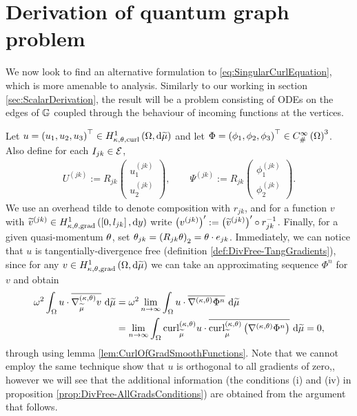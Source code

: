 \section{Derivation of quantum graph problem} \label{sec:3DSystemDerivation}
We now look to find an alternative formulation to \eqref{eq:SingularCurlEquation}, which is more amenable to analysis.
Similarly to our working in section \ref{sec:ScalarDerivation}, the result will be a problem consisting of ODEs on the edges of $\mathbb{G}$ coupled through the behaviour of incoming functions at the vertices.

Let $u=\left( u_1,u_2,u_3 \right)^\top\in H^1_{\kappa,\theta,\mathrm{curl}}\left( \Omega, \mathrm{d}\widetilde{\mu} \right)$ and let $\Phi=\left( \phi_1,\phi_2,\phi_3 \right)^\top\in C^{\infty}_{\#}\left( \Omega \right)^3$.
Also define for each $I_{jk}\in\mathcal{E}$,
\begin{align*}
	U^{(jk)} := R_{jk} \begin{pmatrix} u_1^{(jk)} \\ u_2^{(jk)} \end{pmatrix},
	\qquad
	\Psi^{(jk)} := R_{jk} \begin{pmatrix} \phi_1^{(jk)} \\ \phi_2^{(jk)} \end{pmatrix}.
\end{align*}
We use an overhead tilde to denote composition with $r_{jk}$, and for a function $v$ with $\widetilde{v}^{(jk)}\in H^1_{\kappa,\theta,\mathrm{grad}}\left( \left[ 0,l_{jk} \right], \mathrm{d}y \right)$ write $\left( v^{(jk)} \right)' := \left( \widetilde{v}^{(jk)} \right)' \circ r_{jk}^{-1}$.
Finally, for a given quasi-momentum $\theta$, set $\theta_{jk} = \left(  R_{jk}\theta  \right)_2 = \theta\cdot e_{jk}$.
Immediately, we can notice that $u$ is tangentially-divergence free (definition \ref{def:DivFree-TangGradients}), since for any $v\in H^1_{\kappa,\theta,\mathrm{grad}}\left( \Omega, \mathrm{d}\widetilde{\mu} \right)$ we can take an approximating sequence $\Phi^n$ for $v$ and obtain
\begin{align*}
	\omega^2\int_{\Omega} u\cdot\overline{\nabla^{\left( \kappa, \theta \right)}_{\widetilde{\mu}}v}  \ \mathrm{d}\widetilde{\mu}
	&= \omega^2 \lim_{n\rightarrow\infty} \int_{\Omega} u\cdot\overline{\nabla^{\left( \kappa, \theta \right)}\Phi^n}  \ \mathrm{d}\widetilde{\mu} \\
	&= \lim_{n\rightarrow\infty} \int_{\Omega} \mathrm{curl}_{\widetilde{\mu}}^{\left( \kappa, \theta \right)}u\cdot\overline{\mathrm{curl}_{\widetilde{\mu}}^{\left( \kappa, \theta \right)}\left( \nabla^{\left( \kappa, \theta \right)}\Phi^n \right)}  \ \mathrm{d}\widetilde{\mu}
	= 0,
\end{align*}
through using lemma \ref{lem:CurlOfGradSmoothFunctions}.
Note that we cannot employ the same technique show that $u$ is orthogonal to all gradients of zero,, however we will see that the additional information (the conditions (i) and (iv) in proposition \ref{prop:DivFree-AllGradsConditions}) are obtained from the argument that follows.

